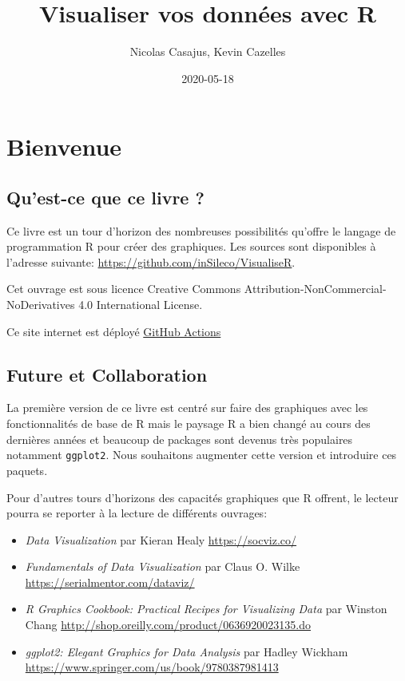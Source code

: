 \documentclass[]{article}
\title{Visualiser vos données avec R}
\author{Nicolas Casajus, Kevin Cazelles}
\date{2020-05-18}
\providecommand{\tightlist}{%
  \setlength{\itemsep}{0pt}\setlength{\parskip}{0pt}}
\begin{document}
\maketitle

{
\setcounter{tocdepth}{2}
\tableofcontents
}
\hypertarget{bienvenue}{%
\section*{Bienvenue}\label{bienvenue}}

\hypertarget{quest-ce-que-ce-livre}{%
\subsection*{Qu'est-ce que ce livre ?}\label{quest-ce-que-ce-livre}}

Ce livre est un tour d'horizon des nombreuses possibilités qu'offre le
langage de programmation R pour créer des graphiques. Les sources sont
disponibles à l'adresse suivante: \url{https://github.com/inSileco/VisualiseR}.

Cet ouvrage est sous licence
Creative Commons Attribution-NonCommercial-NoDerivatives 4.0 International License.

Ce site internet est déployé \href{https://github.com/features/actions}{GitHub
Actions}

\hypertarget{future-et-collaboration}{%
\subsection*{Future et Collaboration}\label{future-et-collaboration}}

La première version de ce livre est centré sur faire des graphiques avec les
fonctionnalités de base de R mais le paysage R a bien changé au cours des
dernières années et beaucoup de packages sont devenus très populaires notamment
\texttt{ggplot2}. Nous souhaitons augmenter cette version et introduire ces paquets.

Pour d'autres tours d'horizons des capacités graphiques que R offrent,
le lecteur pourra se reporter à la lecture de différents ouvrages:

\begin{itemize}
\tightlist
\item
  \emph{Data Visualization} par Kieran Healy \url{https://socviz.co/}
\item
  \emph{Fundamentals of Data Visualization} par Claus O. Wilke \url{https://serialmentor.com/dataviz/}
\item
  \emph{R Graphics Cookbook: Practical Recipes for Visualizing Data} par Winston Chang \url{http://shop.oreilly.com/product/0636920023135.do}
\item
  \emph{ggplot2: Elegant Graphics for Data Analysis} par Hadley Wickham
  \url{https://www.springer.com/us/book/9780387981413}
\end{itemize}
\end{document}
